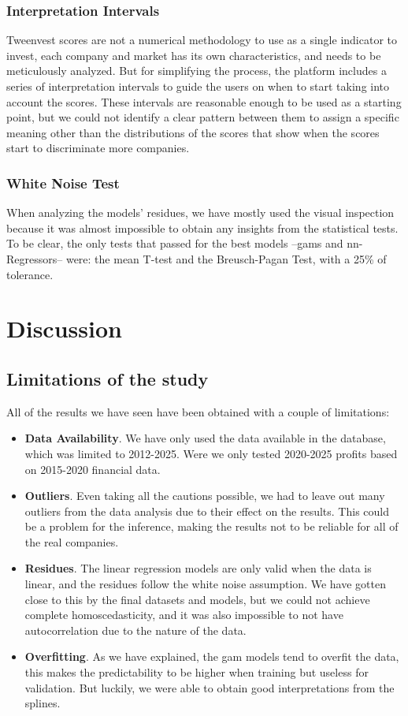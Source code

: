 \documentclass[11pt,english,a4paper,hidelinks]{book}
\begin{document}
\subsubsection{Interpretation Intervals}

\noindent Tweenvest scores are not a numerical methodology to use as a single indicator to invest, each company and market has its own characteristics, and needs to be meticulously analyzed. But for simplifying the process, the platform includes a series of interpretation intervals to guide the users on when to start taking into account the scores. These intervals are reasonable enough to be used as a starting point, but we could not identify a clear pattern between them to assign a specific meaning other than the distributions of the scores that show when the scores start to discriminate more companies.

\subsubsection{White Noise Test}

\noindent When analyzing the models' residues, we have mostly used the visual inspection because it was almost impossible to obtain any insights from the statistical tests. To be clear, the only tests that passed for the best models --\acrshort{gam}s and \acrshort{nn}-Regressors-- were: the mean T-test and the Breusch-Pagan Test, with a 25\% of tolerance.
\section{Discussion}

\subsection{Limitations of the study}
\noindent All of the results we have seen have been obtained with a couple of limitations:
\begin{itemize}
    \item \textbf{Data Availability}. We have only used the data available in the database, which was limited to 2012-2025. Were we only tested 2020-2025 profits based on 2015-2020 financial data.
    \item \textbf{Outliers}. Even taking all the cautions possible, we had to leave out many outliers from the data analysis due to their effect on the results. This could be a problem for the inference, making the results not to be reliable for all of the real companies.
    \item \textbf{Residues}. The linear regression models are only valid when the data is linear, and the residues follow the white noise assumption. We have gotten close to this by the final datasets and models, but we could not achieve complete homoscedasticity, and it was also impossible to not have autocorrelation due to the nature of the data. 
    \item \textbf{Overfitting}. As we have explained, the \acrshort{gam} models tend to overfit the data, this makes the predictability to be higher when training but useless for validation. But luckily, we were able to obtain good interpretations from the splines.
\end{itemize}
\end{document}
